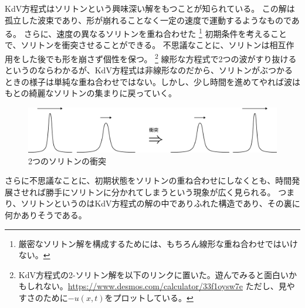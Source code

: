 \documentclass[11pt]{ltjsarticle}
\numberwithin{equation}{section}
\begin{document}
KdV方程式はソリトンという興味深い解をもつことが知られている。
この解は孤立した波束であり、形が崩れることなく一定の速度で運動するようなものである。
さらに、速度の異なるソリトンを重ね合わせた
\footnote{
    厳密なソリトン解を構成するためには、もちろん線形な重ね合わせではいけない。
}
初期条件を考えることで、ソリトンを衝突させることができる。
不思議なことに、ソリトンは相互作用をした後でも形を崩さず個性を保つ。
\footnote{
    KdV方程式の2-ソリトン解を以下のリンクに置いた。遊んでみると面白いかもしれない。\url{https://www.desmos.com/calculator/33f1oysw7e}
    ただし、見やすさのために$-u(x,t)$をプロットしている。
}
線形な方程式で2つの波がすり抜けるというのならわかるが、KdV方程式は非線形なのだから、ソリトンがぶつかるときの様子は単純な重ね合わせではない。しかし、少し時間を進めてやれば波はもとの綺麗なソリトンの集まりに戻っていく。
\begin{figure}[H]
    \centering
    \includegraphics[width=0.8\hsize]{../images/2-soliton.pdf}
    \caption{2つのソリトンの衝突}
\end{figure}
さらに不思議なことに、初期状態をソリトンの重ね合わせにしなくとも、時間発展させれば勝手にソリトンに分かれてしまうという現象が広く見られる。
つまり、ソリトンというのはKdV方程式の解の中でありふれた構造であり、その裏に何かありそうである。
\end{document}
